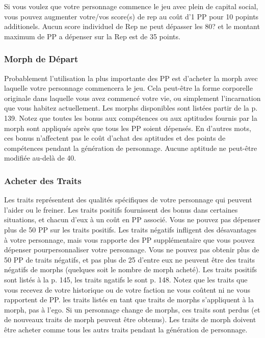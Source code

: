 Si vous voulez que votre personnage commence le jeu avec plein de capital social, vous pouvez augmenter votre/vos score(s) de rep au coût d'1 PP pour 10 popints additionels. Aucun score individuel de Rep ne peut dépasser les 80? et le montant maximum de PP a dépenser sur la Rep est de 35 points. 

\subsubsection{Morph de Départ} \label{sec:starting-morph} 

Probablement l'utilisation la plus importante des PP est d'acheter la morph avec laquelle votre personnage commencera le jeu. Cela peut-être la forme corporelle originale dans laquelle vous avez commencé votre vie, ou simplement l'incarnation que vous habitez actuellement. Les morphs disponibles sont listées  partir de la p. 139. Notez que toutes les bonus aux compétences ou aux aptitudes fournis par la morph sont appliqués après que tous les PP soient dépensés. En d'autres mots, ces bonus n'affectent pas le coût d'achat des aptitudes et des points de compétences pendant la génération de personnage. Aucune aptitude ne peut-être modifiée au-delà de 40. 

\subsubsection{Acheter des Traits} \label{sec:purchasing-traits} 

Les traits représentent des qualités spécifiques de votre personnage qui peuvent l'aider ou le freiner.
Les traits positifs fournissent des bonus dans certaines situations, et chacun d'eux à un coût en PP associé. Vous ne pouvez pas dépenser plus de 50 PP sur les traits positifs.
Les traits négatifs infligent des désavantages à votre personnage, mais vous rapporte des PP supplémentaire que vous pouvez dépenser pourpersonnaliser votre personnage. Vous ne pouvez pas obtenir plus de 50 PP  de traits négatifs, et pas plus de 25 d'entre eux ne peuvent être des traits négatifs de morphs (quelques soit le nombre de morph acheté).
Les traits positifs sont listés à la p. 145, les traits ngatifs le sont p. 148. Notez que les traits que vous recevez de votre historique ou de votre faction ne vous coûtent ni ne vous rapportent de PP. les traits listés en tant que traits de morphs s'appliquent à la morph, pas à l'ego. Si un personnage change de morphs, ces traits sont perdus (et de nouveaux traits de morph peuvent être obtenus). Les traits de morph doivent être acheter comme tous les autrs traits pendant la génération de personnage. 


